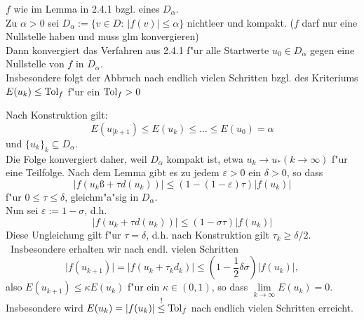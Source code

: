 \documentclass{scrartcl}
\begin{document}
\begin{Satz}
$f$ wie im Lemma in 2.4.1 bzgl. eines $D_\alpha$.  \\
Zu $\alpha > 0$ sei $D_\alpha := \{v \in D: \ \vert f(v) \vert \leq \alpha \}$ nichtleer und kompakt. ($f$ darf nur eine Nullstelle haben und muss glm konvergieren)\\
Dann konvergiert das Verfahren aus 2.4.1 f"ur alle Startwerte $u_0 \in D_\alpha$ gegen eine Nullstelle von $f$ in $D_\alpha$. \\
Insbesondere folgt der Abbruch nach endlich vielen Schritten bzgl. des Kriteriums $E(u_k) \leq \mathrm{Tol}_f$ f"ur ein $\mathrm{Tol}_f > 0$
\end{Satz}
\begin{Bew}
Nach Konstruktion gilt:
$$E(u_{[k+1}) \leq E(u_k) \leq \ldots \leq E(u_0) = \alpha$$
und $\{ u_k \}_k \subseteq D_\alpha$. \\
Die Folge konvergiert daher, weil $D_\alpha$ kompakt ist, etwa $u_k \rightarrow u_* (k \rightarrow \infty)$ f"ur eine Teilfolge. Nach dem Lemma gibt es zu jedem $\varepsilon > 0$ ein $\delta > 0$, so dass 
$$\vert f(u_k ß+ \tau d(u_k)) \vert \leq (1 - (1- \varepsilon) \tau) \vert f(u_k) \vert$$
f"ur $0 \leq \tau \leq \delta$, gleichm"a"sig in $D_\alpha$. \\
Nun sei $\varepsilon := 1 - \sigma$, d.h. 
$$\vert f(u_k + \tau d(u_k)) \vert \leq (1 - \sigma \tau) \vert f(u_k) \vert$$ 
Diese Ungleichung gilt f"ur $\tau = \delta$, d.h. nach Konstruktion gilt $\tau_k \geq \delta/2$. \
Insbesondere erhalten wir nach endl. vielen Schritten 
$$\vert f(u_{k+1} ) \vert = \vert f(u_k + \tau_k d_k ) \vert \leq  (1 - \frac12 \delta \sigma) \vert f(u_k) \vert,$$
also $E(u_{k+1}) \leq \kappa E(u_k)$ f"ur ein $\kappa \in (0,1)$, so dass $\lim\limits_{k \rightarrow \infty} E(u_k) = 0$. Insbesondere wird $E(u_k) = \vert f(u_k) \vert \stackrel{!}{\leq} \mathrm{Tol}_f$ nach endlich vielen Schritten erreicht.
\end{Bew}
\end{document}
